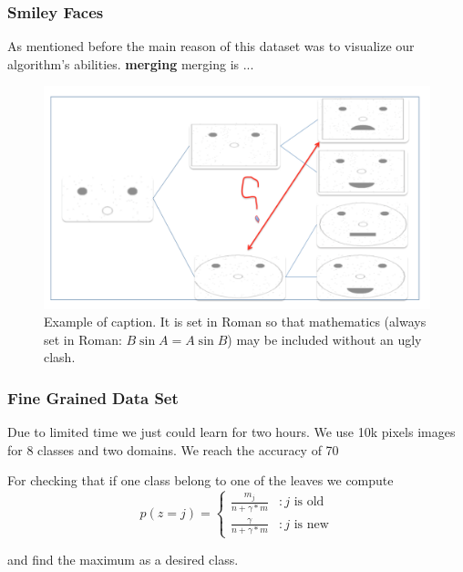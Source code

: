 \documentclass[10pt,twocolumn,letterpaper]{article}
\begin{document}
 \subsubsection{Smiley Faces}
 As mentioned before the main reason of this dataset was to visualize our algorithm's abilities.
 \textbf{merging} merging is ...
 \begin{figure}[t]
 	\begin{center}
 		\includegraphics[width=0.8\linewidth]{merge}
 	\end{center}
 	\caption{Example of caption.  It is set in Roman so that mathematics
 		(always set in Roman: $B \sin A = A \sin B$) may be included without an
 		ugly clash.}
 	\label{fig:long}
 	\label{fig:onecol}
 \end{figure}
 
 


 \subsubsection{Fine Grained Data Set}
Due to limited time we just could learn for two hours. We use 10k pixels images for 8 classes and two domains. We reach the accuracy of 70%

For checking that if one class belong to one of the leaves we compute 
\begin{displaymath}
p(z=j) = \left \{
\begin{array}{lr}
\frac{m_{j}}{n+\gamma*m} & : \text{$j$ is old} \\
\frac{\gamma}{n+\gamma*m} & : \text{$j$ is new}
\end{array}
\right.
\end{displaymath}  

and find the maximum as a desired class.
\end{document}
